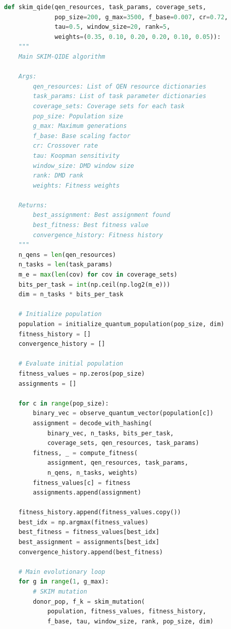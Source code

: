 \documentclass[12pt,a4paper]{article}
\begin{document}
\begin{lstlisting}[language=Python, caption=Complete SKIM-QIDE Framework]
def skim_qide(qen_resources, task_params, coverage_sets,
              pop_size=200, g_max=3500, f_base=0.007, cr=0.72,
              tau=0.5, window_size=20, rank=5,
              weights=(0.35, 0.10, 0.20, 0.20, 0.10, 0.05)):
    """
    Main SKIM-QIDE algorithm
    
    Args:
        qen_resources: List of QEN resource dictionaries
        task_params: List of task parameter dictionaries
        coverage_sets: Coverage sets for each task
        pop_size: Population size
        g_max: Maximum generations
        f_base: Base scaling factor
        cr: Crossover rate
        tau: Koopman sensitivity
        window_size: DMD window size
        rank: DMD rank
        weights: Fitness weights
    
    Returns:
        best_assignment: Best assignment found
        best_fitness: Best fitness value
        convergence_history: Fitness history
    """
    n_qens = len(qen_resources)
    n_tasks = len(task_params)
    m_e = max(len(cov) for cov in coverage_sets)
    bits_per_task = int(np.ceil(np.log2(m_e)))
    dim = n_tasks * bits_per_task
    
    # Initialize population
    population = initialize_quantum_population(pop_size, dim)
    fitness_history = []
    convergence_history = []
    
    # Evaluate initial population
    fitness_values = np.zeros(pop_size)
    assignments = []
    
    for c in range(pop_size):
        binary_vec = observe_quantum_vector(population[c])
        assignment = decode_with_hashing(
            binary_vec, n_tasks, bits_per_task,
            coverage_sets, qen_resources, task_params)
        fitness, _ = compute_fitness(
            assignment, qen_resources, task_params,
            n_qens, n_tasks, weights)
        fitness_values[c] = fitness
        assignments.append(assignment)
    
    fitness_history.append(fitness_values.copy())
    best_idx = np.argmax(fitness_values)
    best_fitness = fitness_values[best_idx]
    best_assignment = assignments[best_idx]
    convergence_history.append(best_fitness)
    
    # Main evolutionary loop
    for g in range(1, g_max):
        # SKIM mutation
        donor_pop, f_k = skim_mutation(
            population, fitness_values, fitness_history,
            f_base, tau, window_size, rank, pop_size, dim)
        

\end{lstlisting}
\end{document}
